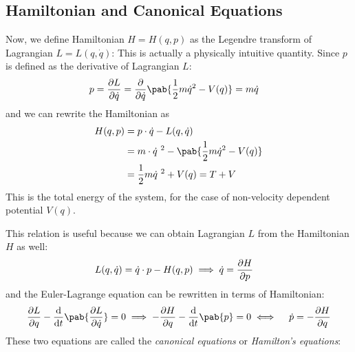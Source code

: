 \subsection{Hamiltonian and Canonical Equations}
Now, we define Hamiltonian $H = H(q, p)$ as the Legendre transform of Lagrangian $L = L(q, \dot{q})$:
This is actually a physically intuitive quantity. Since $p$ is defined as the derivative of Lagrangian $L$:
\begin{align}
  p & = \pdv{L}{\dot{q}} = \pdv{}{\dot{q}} \pab{\frac{1}{2} m \dot{q}^2 - V(q)} = m \dot{q}
\end{align}
and we can rewrite the Hamiltonian as
\begin{align}
  H(q, p) & = p \cdot \dot{q} - L(q, \dot{q})                              \\
          & = m \cdot \dot{q}^{\ 2} - \pab{\frac{1}{2} m \dot{q}^2 - V(q)} \\
          & = \frac{1}{2} m \dot{q}^{\ 2} + V(q) = T + V
\end{align}
This is the total energy of the system, for the case of non-velocity dependent potential $V(q)$.

This relation is useful because we can obtain Lagrangian $L$ from the Hamiltonian $H$ as well:
\begin{align}
  L(q, \dot{q}) & = \dot{q} \cdot p - H(q, p) \implies \dot{q} = \pdv{H}{p}
\end{align}
and the Euler-Lagrange equation can be rewritten in terms of Hamiltonian:
\begin{align}
  \pdv{L}{q} - \odv{}{t} \pab{\pdv{L}{\dot{q}}} = 0
  \implies -\pdv{H}{q} - \odv{}{t} \pab{p} = 0
  \iff \quad \dot{p} = - \pdv{H}{q}
\end{align}
These two equations are called the \emph{canonical equations} or \emph{Hamilton's equations}:

